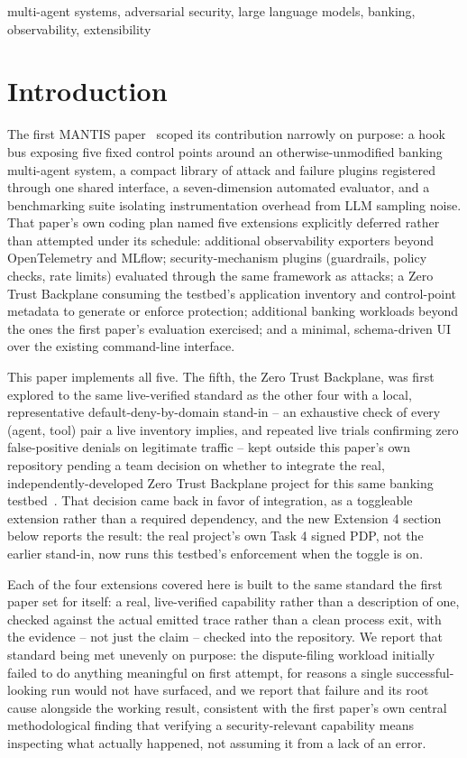 \documentclass[conference]{IEEEtran}
\begin{document}
\begin{abstract}
\end{abstract}

\begin{IEEEkeywords}
multi-agent systems, adversarial security, large language models, banking, observability, extensibility
\end{IEEEkeywords}

\section{Introduction}

The first MANTIS paper~\cite{mantis_paper1} scoped its contribution narrowly on purpose: a hook bus exposing five fixed control points around an otherwise-unmodified banking multi-agent system, a compact library of attack and failure plugins registered through one shared interface, a seven-dimension automated evaluator, and a benchmarking suite isolating instrumentation overhead from LLM sampling noise. That paper's own coding plan named five extensions explicitly deferred rather than attempted under its schedule: additional observability exporters beyond OpenTelemetry and MLflow; security-mechanism plugins (guardrails, policy checks, rate limits) evaluated through the same framework as attacks; a Zero Trust Backplane consuming the testbed's application inventory and control-point metadata to generate or enforce protection; additional banking workloads beyond the ones the first paper's evaluation exercised; and a minimal, schema-driven UI over the existing command-line interface.

This paper implements all five. The fifth, the Zero Trust Backplane, was first explored to the same live-verified standard as the other four with a local, representative default-deny-by-domain stand-in -- an exhaustive check of every (agent, tool) pair a live inventory implies, and repeated live trials confirming zero false-positive denials on legitimate traffic -- kept outside this paper's own repository pending a team decision on whether to integrate the real, independently-developed Zero Trust Backplane project for this same banking testbed~\cite{ztb_repo}. That decision came back in favor of integration, as a toggleable extension rather than a required dependency, and the new Extension 4 section below reports the result: the real project's own Task 4 signed PDP, not the earlier stand-in, now runs this testbed's enforcement when the toggle is on.

Each of the four extensions covered here is built to the same standard the first paper set for itself: a real, live-verified capability rather than a description of one, checked against the actual emitted trace rather than a clean process exit, with the evidence -- not just the claim -- checked into the repository. We report that standard being met unevenly on purpose: the dispute-filing workload initially failed to do anything meaningful on first attempt, for reasons a single successful-looking run would not have surfaced, and we report that failure and its root cause alongside the working result, consistent with the first paper's own central methodological finding that verifying a security-relevant capability means inspecting what actually happened, not assuming it from a lack of an error.
\end{document}
